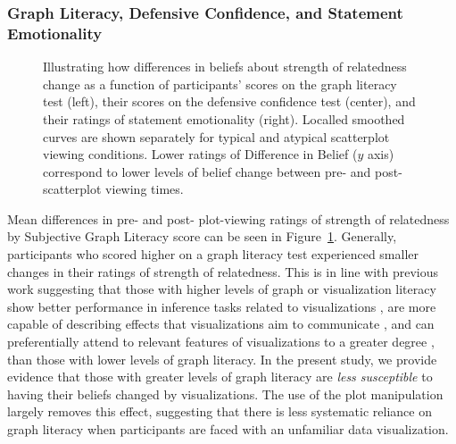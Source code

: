 \documentclass[manuscript,screen,review,anonymous]{acmart}
\begin{document}
\subsubsection{Graph Literacy, Defensive Confidence, and Statement
Emotionality}\label{sec-add-analyses-discussion}

\begin{figure}


\caption{\label{fig-add-analyses-plots}Illustrating how differences in
beliefs about strength of relatedness change as a function of
participants' scores on the graph literacy test (left), their scores on
the defensive confidence test (center), and their ratings of statement
emotionality (right). Localled smoothed curves are shown separately for
typical and atypical scatterplot viewing conditions. Lower ratings of
Difference in Belief (\(y\) axis) correspond to lower levels of belief
change between pre- and post- scatterplot viewing times.}

\end{figure}%

Mean differences in pre- and post- plot-viewing ratings of strength of
relatedness by Subjective Graph Literacy score can be seen in
Figure~\ref{fig-add-analyses-plots}. Generally, participants who scored
higher on a graph literacy test experienced smaller changes in their
ratings of strength of relatedness. This is in line with previous work
suggesting that those with higher levels of graph or visualization
literacy show better performance in inference tasks related to
visualizations \citep{canham_2010}, are more capable of describing
effects that visualizations aim to communicate \citep{shah_2011}, and
can preferentially attend to relevant features of visualizations to a
greater degree \citep{okan_2016}, than those with lower levels of graph
literacy. In the present study, we provide evidence that those with
greater levels of graph literacy are \emph{less susceptible} to having
their beliefs changed by visualizations. The use of the plot
manipulation largely removes this effect, suggesting that there is less
systematic reliance on graph literacy when participants are faced with
an unfamiliar data visualization.
\end{document}
